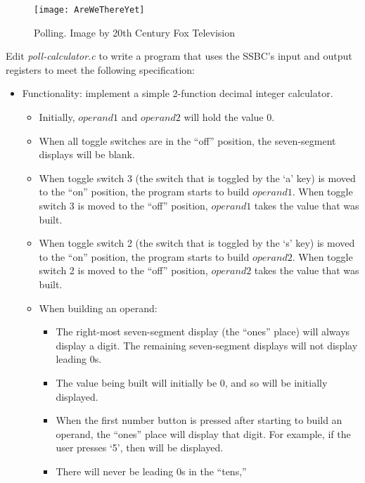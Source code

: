 \begin{figure}
    \centering
    \texttt{[image: AreWeThereYet]}
    \caption{Polling. \tiny Image by 20th Century Fox Television}
\end{figure}

Edit \textit{poll-calculator.c} to write a program that uses the SSBC's input
and output registers to meet the following specification:

\begin{itemize}
    \item Functionality: implement a simple 2-function decimal integer
        calculator.
    \begin{itemize}
        \item Initially, $operand1$ and $operand2$ will hold the
            value $0$.
        \item When all toggle switches are in the ``off'' position, the
            seven-segment displays will be blank.
        \item When toggle switch 3 (the switch that is toggled by the `a' key)
            is moved to the ``on'' position, the program starts to build
            $operand1$. When toggle switch 3 is moved to the ``off''
            position, $operand1$ takes the value that was built.
        \item When toggle switch 2 (the switch that is toggled by the `s' key)
            is moved to the ``on'' position, the program starts to build
            $operand2$. When toggle switch 2 is moved to the ``off''
            position, $operand2$ takes the value that was built.
        \item When building an operand:
        \begin{itemize}
            \item The right-most seven-segment display (the ``ones'' place)
                will always display a digit. The remaining seven-segment
                displays will not display leading $0$s.
            \item The value being built will initially be $0$, and so {} will be initially displayed.
            \item When the first number button is pressed after starting to
                build an operand, the ``ones'' place will display that digit.
                For example, if the user presses `5', then {} will be
                displayed.
            \item There will never be leading $0$s in the ``tens,''

\end{itemize}
\end{itemize}
\end{itemize}
